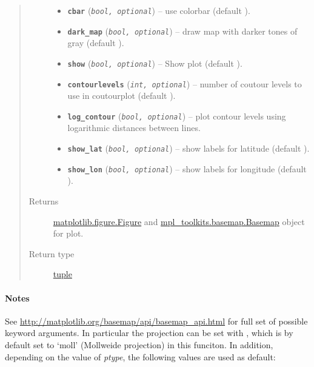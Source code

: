 \documentclass[letterpaper,10pt,english]{sphinxhowto}
\begin{document}
\begin{fulllineitems}
\begin{quote}
\begin{description}
\begin{itemize}
\item {} 
\textbf{\texttt{cbar}} (\emph{\texttt{bool, optional}}) -- use colorbar (default ).

\item {} 
\textbf{\texttt{dark\_map}} (\emph{\texttt{bool, optional}}) -- draw map with darker tones of gray (default ).

\item {} 
\textbf{\texttt{show}} (\emph{\texttt{bool, optional}}) -- Show plot (default ).

\item {} 
\textbf{\texttt{contourlevels}} (\emph{\texttt{int, optional}}) -- number of coutour levels to use in coutourplot (default ).

\item {} 
\textbf{\texttt{log\_contour}} (\emph{\texttt{bool, optional}}) -- plot contour levels using logarithmic distances between lines.

\item {} 
\textbf{\texttt{show\_lat}} (\emph{\texttt{bool, optional}}) -- show labels for latitude (default ).

\item {} 
\textbf{\texttt{show\_lon}} (\emph{\texttt{bool, optional}}) -- show labels for longitude (default ).

\end{itemize}

\item[{Returns}] \leavevmode
\href{http://matplotlib.org/api/figure\_api.html\#matplotlib.figure.Figure}{matplotlib.figure.Figure} and \href{http://matplotlib.org/basemap/api/basemap\_api.html\#mpl\_toolkits.basemap.Basemap}{mpl\_toolkits.basemap.Basemap}
object for plot.

\item[{Return type}] \leavevmode
\href{https://docs.python.org/library/functions.html\#tuple}{tuple}

\end{description}\end{quote}
\paragraph{Notes}

See \href{http://matplotlib.org/basemap/api/basemap\_api.html}{http://matplotlib.org/basemap/api/basemap\_api.html} for full set
of possible keyword arguments. In particular the projection can be
set with , which is by default set to `moll'
(Mollweide projection) in this funciton. In addition, depending on
the value of \emph{ptype}, the following values are used as default:


\end{fulllineitems}
\end{document}

